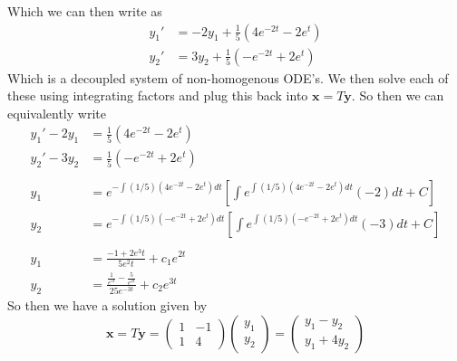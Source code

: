 \documentclass{article}
\theoremstyle{definition}
\begin{document}
    Which we can then write as 
    \begin{align*}
        y_1' &= -2y_1 + \frac{1}{5}(4e^{-2t} - 2e^t)\\
        y_2' &= 3y_2 + \frac{1}{5}(-e^{-2t} + 2e^t)
    \end{align*}
    Which is a decoupled system of non-homogenous ODE's. We then solve each of these using integrating factors
    and plug this back into $\bm x = T\bm y$.
    So then we can equivalently write 
    \begin{align*}
        y_1' - 2y_1 &= \frac{1}{5}(4e^{-2t} - 2e^t) \\
        y_2' - 3y_2 &= \frac{1}{5}(-e^{-2t} + 2e^t) \\\\
        y_1 &= e^{
            -\int (1/5) (4e^{-2t} - 2e^t)dt
        } \left[
            \int e^{
                \int (1/5) (4e^{-2t} - 2e^t)dt
            }(-2)dt + C
        \right] \\
        y_2 &=  e^{
            -\int (1/5) (-e^{-2t} + 2e^t)dt
        } \left[
            \int e^{
                \int (1/5) (-e^{-2t} + 2e^t)dt
            }(-3)dt + C
        \right] \\\\
        y_1 &= \frac{-1 + 2e^3t}{5e^2t} + c_1e^{2t} \\
        y_2 &= \frac{\frac{1}{e^{5t}}-\frac{5}{e^{2t}}}{25e^{-3t}}+c_2e^{3t}
    \end{align*}
    So then we have a solution given by 
    \[
        \bm x = T\bm y = \begin{pmatrix}
            1 & -1 \\
            1 & 4
        \end{pmatrix}   
        \begin{pmatrix}
            y_1 \\ y_2
        \end{pmatrix}
        = \begin{pmatrix}
            y_1 - y_2 \\
            y_1 + 4y_2
        \end{pmatrix}
    \]
\end{document}
